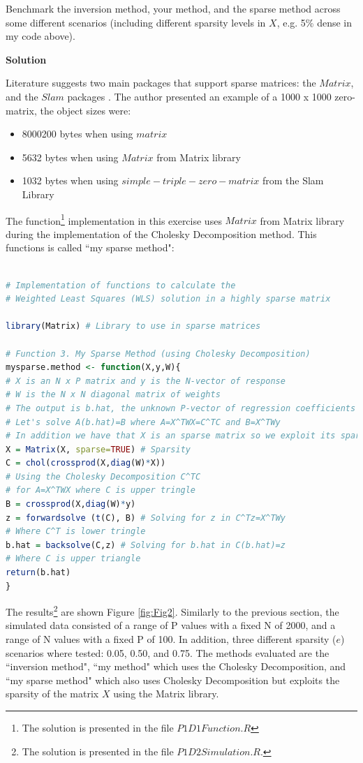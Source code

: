 \documentclass[11 pt]{article}
\begin{document}
\begin{enumerate}[label=(\Alph*)]
Benchmark the inversion method, your method, and the sparse method across some different scenarios (including different sparsity levels in $X$, e.g. 5\% dense in my code above).


\vspace{2mm}
\textbf{Solution}

Literature suggests two main packages  that support sparse matrices: the $Matrix$, and the $Slam$ packages \cite{john2011}. The author presented an example of a 1000 x 1000 zero-matrix, the object sizes were:
\begin{itemize}
	\item 8000200 bytes when using $matrix$
	\item 5632 bytes when using $Matrix$ from Matrix library
	\item 1032 bytes when using $simple-triple-zero-matrix$ from the Slam Library
\end{itemize}

The function\footnote{The solution is presented in the file $P1D1Function.R$} implementation in this exercise uses $Matrix$ from Matrix library during the implementation of the  Cholesky Decomposition method. This functions is called ``my sparse method":
\newpage
\begin{lstlisting}[language=R]

# Implementation of functions to calculate the 
# Weighted Least Squares (WLS) solution in a highly sparse matrix

library(Matrix) # Library to use in sparse matrices

# Function 3. My Sparse Method (using Cholesky Decomposition)
mysparse.method <- function(X,y,W){
# X is an N x P matrix and y is the N-vector of response
# W is the N x N diagonal matrix of weights
# The output is b.hat, the unknown P-vector of regression coefficients 
# Let's solve A(b.hat)=B where A=X^TWX=C^TC and B=X^TWy
# In addition we have that X is an sparse matrix so we exploit its sparsity
X = Matrix(X, sparse=TRUE) # Sparsity
C = chol(crossprod(X,diag(W)*X)) 
# Using the Cholesky Decomposition C^TC
# for A=X^TWX where C is upper tringle
B = crossprod(X,diag(W)*y)
z = forwardsolve (t(C), B) # Solving for z in C^Tz=X^TWy 
# Where C^T is lower tringle 
b.hat = backsolve(C,z) # Solving for b.hat in C(b.hat)=z
# Where C is upper triangle 
return(b.hat)
}
\end{lstlisting}

The results\footnote{The solution is presented in the file $P1D2Simulation.R$.} are shown Figure \ref{fig:Fig2}. Similarly to the previous section, the simulated data consisted of a range of P values with a fixed N of 2000, and a range of N values with a fixed P of 100. In addition, three different sparsity ($e$) scenarios where tested: 0.05, 0.50, and 0.75. The methods evaluated are the  ``inversion method", ``my method" which uses the Cholesky Decomposition, and ``my sparse method" which also uses Cholesky Decomposition but exploits the sparsity of the matrix $X$ using the Matrix library.


\end{enumerate}
\end{document}
